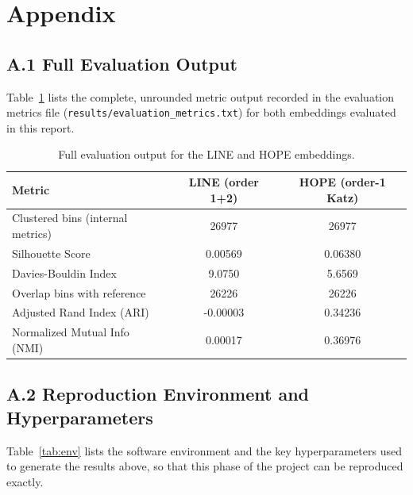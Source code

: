\documentclass[12pt]{article}
\begin{document}
\section{Appendix}

\subsection*{A.1 Full Evaluation Output}
Table~\ref{tab:appendix} lists the complete, unrounded metric output recorded in the evaluation
metrics file (\texttt{results/evaluation\_metrics.txt}) for both embeddings evaluated in this
report.

\begin{table}[h]
\centering
\small
\caption{Full evaluation output for the LINE and HOPE embeddings.}
\label{tab:appendix}
\begin{tabular}{lcc}
\toprule
\textbf{Metric} & \textbf{LINE (order 1+2)} & \textbf{HOPE (order-1 Katz)} \\
\midrule
Clustered bins (internal metrics) & 26977 & 26977 \\
Silhouette Score & 0.00569 & 0.06380 \\
Davies-Bouldin Index & 9.0750 & 5.6569 \\
Overlap bins with reference & 26226 & 26226 \\
Adjusted Rand Index (ARI) & -0.00003 & 0.34236 \\
Normalized Mutual Info (NMI) & 0.00017 & 0.36976 \\
\bottomrule
\end{tabular}
\end{table}

\subsection*{A.2 Reproduction Environment and Hyperparameters}
Table~\ref{tab:env} lists the software environment and the key hyperparameters used to generate
the results above, so that this phase of the project can be reproduced exactly.
\end{document}
